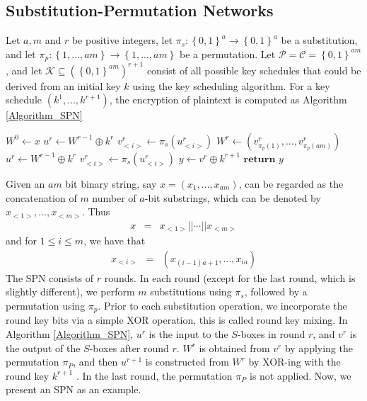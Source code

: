 \subsection{Substitution-Permutation Networks }
\begin{defn} \label{SPN_definition} \citep{spn_definition_book}
Let $a,m$ and $r$ be positive integers, let $\pi_s:\left\lbrace 0,1 \right\rbrace^{a} \rightarrow \left\lbrace 0,1 \right\rbrace^{a}$ be a substitution, and let $\pi_p: \left\lbrace 1,...,am\right\rbrace \rightarrow \left\lbrace 1,...,am\right\rbrace$ be a permutation. Let $\mathcal{P} = \mathcal{C}=\left\lbrace 0,1 \right\rbrace^{am}$, and let $\mathcal{K} \subseteq (\left\lbrace 0,1 \right\rbrace^{am})^{r+1}$ consist of all possible key schedules that could be derived from an initial key $k$ using the key scheduling algorithm. For a key schedule $(k^1,...,k^{r+1})$, the encryption of plaintext is computed as Algorithm \ref{Algorithm_SPN}
\end{defn}
\begin{algorithm}
\caption{: $SPN(x,\pi_s,\pi_p,(k^1,...,k^{r+1}))$}
\label{Algorithm_SPN}
\begin{algorithmic}
\State $W^0 \leftarrow x$
	\State $u^{r} \leftarrow W^{r-1} \oplus k^r$
	\State $v^r_{<i>} \leftarrow \pi_s(u^r_{<i>})$
	\EndFor
	\State $W^r \leftarrow (v^r_{\pi_p(1)},...,v^r_{\pi_p(am)})$
\EndFor
\State $u^{r} \leftarrow W^{r-1} \oplus k^{r}$
\State $v^{r}_{<i>} \leftarrow \pi_s(u^{r}_{<i>})$
\EndFor
\State $y \leftarrow v^{r} \oplus k^{r+1}$
\State $\textbf{return }y$
\end{algorithmic}
\end{algorithm}Given an $am$ bit binary string, say $x = (x_1,...,x_{am})$, can be regarded as the concatenation of $m$ number of $a$-bit substrings, which can be denoted by $x_{<1>},...,x_{<m>}$. Thus
\begin{eqnarray*}
x &=& x_{<1>}||\cdots||x_{<m>}
\end{eqnarray*} 
and for $1 \leq i \leq m$, we have that 
\begin{eqnarray*}
x_{<i>} &=& (x_{(i-1)a+1},...,x_{ia})
\end{eqnarray*} The SPN consists of $r$ rounds. In each round (except for the last round, which is slightly different), we perform $m$ substitutions using $\pi_s$, followed by a permutation using $\pi_p$. Prior to each substitution operation, we incorporate the round key bits via a simple XOR operation, this is called round key mixing. In Algorithm \ref{Algorithm_SPN}, $u^r$ is the input to the $S$-boxes in round $r$, and $v^r$ is the output of the $S$-boxes after round $r$. $W^r$ is obtained from $v^r$ by applying the permutation $\pi_P$, and then $u^{r+1}$ is constructed from $W^r$ by XOR-ing with the round key $k^{r+1}$ . In the last round, the permutation $\pi_P$ is not applied. Now, we present an SPN as an example.
